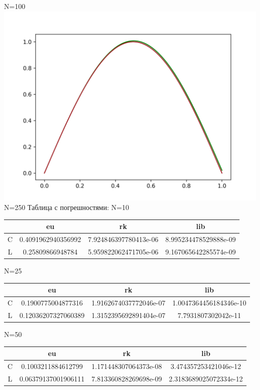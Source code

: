 \documentclass[a4paper,14pt]{article}
\begin{document}
N=100\newline
\includegraphics[scale=0.5]{images/graphs/тест_250.png}\newline
N=250\newpage
Таблица с погрешностями:\newline
N=10
\begin{center}
\begin{tabular}{ |c|c|c|c| } 
 \hline
 & eu & rk & lib \\
 \hline
 C& 0.4091962940356992 & 7.924846397780413e-06 & 8.995234478529888e-09 \\
 \hline
 L& 0.25809866948784 & 5.959822062471705e-06 & 9.167065642285574e-09 \\
 \hline
\end{tabular}
\end{center}
N=25
\begin{center}
\begin{tabular}{ |c|c|c|c| } 
 \hline
 & eu & rk & lib \\
 \hline
 C& 0.1900775004877316 & 1.9162674037772046e-07 & 1.0047364456184346e-10 \\
 \hline
 L& 0.12036207327060389 & 1.3152395692891404e-07 & 7.7931807302042e-11 \\
 \hline
\end{tabular}
\end{center}
N=50
\begin{center}
\begin{tabular}{ |c|c|c|c| } 
 \hline
 & eu & rk & lib \\
 \hline
 C& 0.1003211884612799 & 1.171448307064373e-08 & 3.474357253421046e-12 \\
 \hline
 L& 0.06379137001906111 & 7.813360828269698e-09 & 2.3183689025072334e-12 \\
 \hline
\end{tabular}
\end{center}
\end{document}
